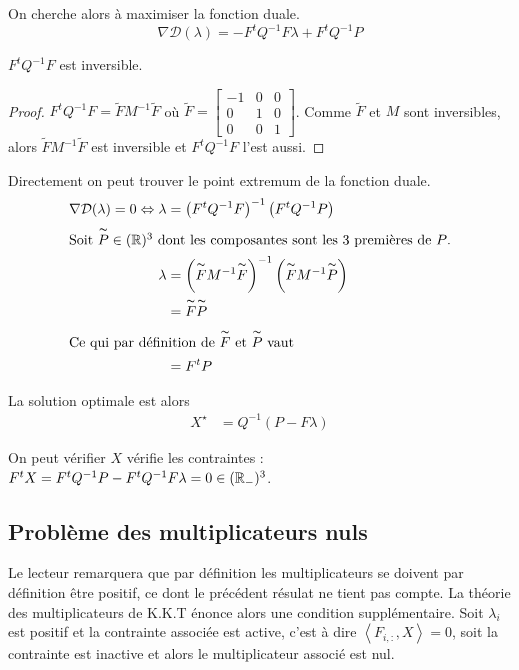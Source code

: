 On cherche alors à maximiser la fonction duale.
\begin{equation}
\nabla \mathcal D (\lambda) = -F^tQ^{-1}F\lambda + F^tQ^{-1}P
\end{equation}

\begin{prop}[Inversibilité de \(F^tQ^{-1}F\)]
  \(F^tQ^{-1}F\) est inversible.
\end{prop}
\begin{proof}
\(F^tQ^{-1}F = \tilde FM^{-1}\tilde F\) où \(\tilde F = \begin{bmatrix}
-1 & 0 & 0 \\
0 & 1 & 0 \\
0 & 0 & 1
\end{bmatrix}\).  Comme \(\tilde F\) et \(M\) sont inversibles, alors \(\tilde FM^{-1}\tilde F\) est inversible et \(F^tQ^{-1}F\) l'est aussi.
\end{proof}

Directement on peut trouver le point extremum de la fonction duale.
\begin{align}
\nabla \mathcal D (\lambda) = 0 \Leftrightarrow \lambda &= \left(F^tQ^{-1}F\right)^{-1}\left(F^tQ^{-1}P\right)\\
\intertext{Soit \(\overset{\thicksim}{P}\in (\mathbb R)^3\) dont les composantes sont les 3 premières de \(P\).}
\lambda &  = \left(\overset{\thicksim}{F}M^{-1}\overset{\thicksim}{F}\right)^{-1}\left(\overset{\thicksim}{F}M^{-1}\overset{\thicksim}{P}\right) \\
& = \overset{\thicksim}{F}\overset{\thicksim}{P}\\
\intertext{Ce qui par définition de \(\overset{\thicksim}{F}\) et \(\overset{\thicksim}{P}\) vaut}
& = F^tP
\end{align}

La solution optimale est alors
\begin{align}
X^\star &= Q^{-1}\left(P- F\lambda\right)
\end{align}

On peut vérifier \(X\) vérifie les contraintes : \( F^t X = F^t Q^{-1} P - F^tQ^{-1}F\lambda = 0 \in (\mathbb R_-)^3\).

\subsection{Problème des multiplicateurs nuls}


Le lecteur remarquera que par définition les multiplicateurs se doivent par définition être positif, ce dont le précédent résulat ne tient pas compte. La théorie des multiplicateurs de K.K.T énonce alors une condition supplémentaire.
Soit \(\lambda_i\) est positif et la contrainte associée est active, c'est à dire \(\left<F_{i,:},X\right> = 0\), soit la contrainte est inactive et alors le multiplicateur associé est nul.


